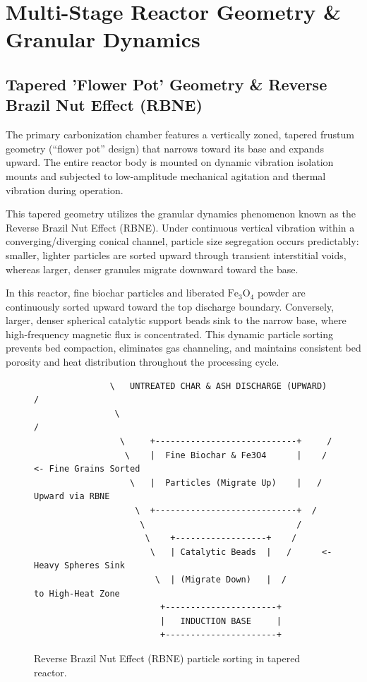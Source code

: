 \documentclass[10pt,twocolumn,a4paper]{article}
\begin{document}
\section{Multi-Stage Reactor Geometry \& Granular Dynamics}

\subsection{Tapered 'Flower Pot' Geometry \& Reverse Brazil Nut Effect (RBNE)}

The primary carbonization chamber features a vertically zoned, tapered frustum geometry (``flower pot'' design) that narrows toward its base and expands upward. The entire reactor body is mounted on dynamic vibration isolation mounts and subjected to low-amplitude mechanical agitation and thermal vibration during operation.

This tapered geometry utilizes the granular dynamics phenomenon known as the Reverse Brazil Nut Effect (RBNE). Under continuous vertical vibration within a converging/diverging conical channel, particle size segregation occurs predictably: smaller, lighter particles are sorted upward through transient interstitial voids, whereas larger, denser granules migrate downward toward the base.

In this reactor, fine biochar particles and liberated $\text{Fe}_3\text{O}_4$ powder are continuously sorted upward toward the top discharge boundary. Conversely, larger, denser spherical catalytic support beads sink to the narrow base, where high-frequency magnetic flux is concentrated. This dynamic particle sorting prevents bed compaction, eliminates gas channeling, and maintains consistent bed porosity and heat distribution throughout the processing cycle.

\begin{figure}[H]
\centering
\small
\begin{verbatim}
               \   UNTREATED CHAR & ASH DISCHARGE (UPWARD)  /
                \                                          /
                 \     +----------------------------+     /
                  \    |  Fine Biochar & Fe3O4      |    /   <- Fine Grains Sorted
                   \   |  Particles (Migrate Up)    |   /       Upward via RBNE
                    \  +----------------------------+  /
                     \                              /
                      \    +------------------+    /
                       \   | Catalytic Beads  |   /      <- Heavy Spheres Sink
                        \  | (Migrate Down)   |  /          to High-Heat Zone
                         +----------------------+
                         |   INDUCTION BASE     |
                         +----------------------+
\end{verbatim}
\caption{Reverse Brazil Nut Effect (RBNE) particle sorting in tapered reactor.}
\label{fig:rbne_sorting}
\end{figure}
\end{document}
